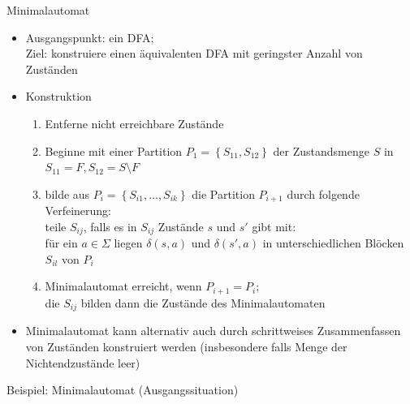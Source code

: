 \begin{frame}{Minimalautomat}
	\begin{itemize}
		\item Ausgangspunkt: ein DFA;\\
		Ziel: konstruiere einen äquivalenten DFA mit geringster Anzahl von Zuständen
		\item Konstruktion
		\begin{enumerate}
			\item Entferne nicht erreichbare Zustände
			\item Beginne mit einer Partition $P_1=\left\{S_{11}, S_{12}\right\}$ der Zustandsmenge $S$ in $S_{11}=F, S_{12}=S \setminus F$
			\item bilde aus $P_i=\left\{S_{i1},\ldots,S_{ik}\right\}$ die Partition $P_{i+1}$ durch folgende Verfeinerung:\\
			teile $S_{ij}$, falls es in $S_{ij}$ Zustände $s$ und $s'$ gibt mit:\\
			für ein $a \in \Sigma$ liegen $\delta(s, a)$ und $\delta(s', a)$ in unterschiedlichen Blöcken $S_{il}$ von $P_i$
			\item Minimalautomat erreicht, wenn $P_{i+1}=P_i$;\\
			die $S_{ij}$ bilden dann die Zustände des Minimalautomaten
		\end{enumerate}
		\item Minimalautomat kann alternativ auch durch schrittweises Zusammenfassen von Zuständen konstruiert werden (insbesondere falls Menge der Nichtendzustände leer)
	\end{itemize}
\end{frame}

\begin{frame}{Beispiel: Minimalautomat (Ausgangssituation)}
	\centering
\end{frame}

